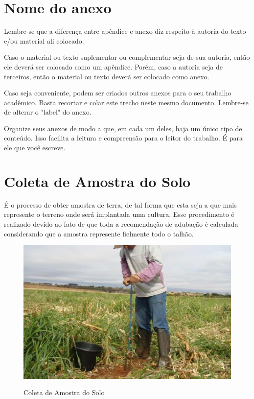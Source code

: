 
\begin{anexosenv}
\partanexos

\chapter{Nome do anexo}     %
\label{chap:anexoA}

Lembre-se que a diferença entre apêndice e anexo diz respeito à autoria do texto e/ou material ali colocado.

Caso o material ou texto suplementar ou complementar seja de sua autoria, então ele deverá ser colocado como um apêndice. Porém, caso a autoria seja de terceiros, então o material ou texto deverá ser colocado como anexo.

Caso seja conveniente, podem ser criados outros anexos para o seu trabalho acadêmico. Basta recortar e colar este trecho neste mesmo documento. Lembre-se de alterar o "label"{} do anexo.

Organize seus anexos de modo a que, em cada um deles, haja um único tipo de conteúdo. Isso facilita a leitura e compreensão para o leitor do trabalho. É para ele que você escreve.

\chapter{Coleta de Amostra do Solo}
\label{chap:anexoColeta}

É o processo de obter amostra de terra, de tal forma que esta seja a que mais represente o terreno onde será implantada uma cultura. Esse procedimento é realizado devido ao fato de que toda a recomendação de adubação é calculada considerando que a amostra represente fielmente todo o talhão.

\begin{figure}[H]
    \centering
    \caption{Coleta de Amostra do Solo}
    \includegraphics[width=13cm]{./dados/figuras/coleta_de_amostra_do_solo.jpg}
    \label{fig:coletadeamostra}
\end{figure}



\end{anexosenv}
